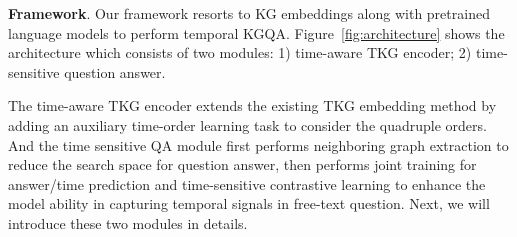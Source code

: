 \documentclass[11pt]{article}
\newcommand{\xhdr}[1]{{\noindent\bfseries #1}.}
\begin{document}









\xhdr{Framework} Our framework resorts to KG embeddings along with pretrained language models to perform temporal KGQA.  Figure~\ref{fig:architecture} shows the architecture which consists of two modules: 1) time-aware TKG encoder; 2) time-sensitive question answer. 

The time-aware TKG encoder extends the existing TKG embedding method by adding an auxiliary time-order learning task to consider the quadruple orders. And the time sensitive QA module first performs neighboring graph extraction to reduce the search space for question answer, then performs joint training for answer/time prediction and time-sensitive contrastive learning to enhance the model ability in capturing temporal signals in free-text question. Next, we will introduce these two modules in details.
\end{document}
